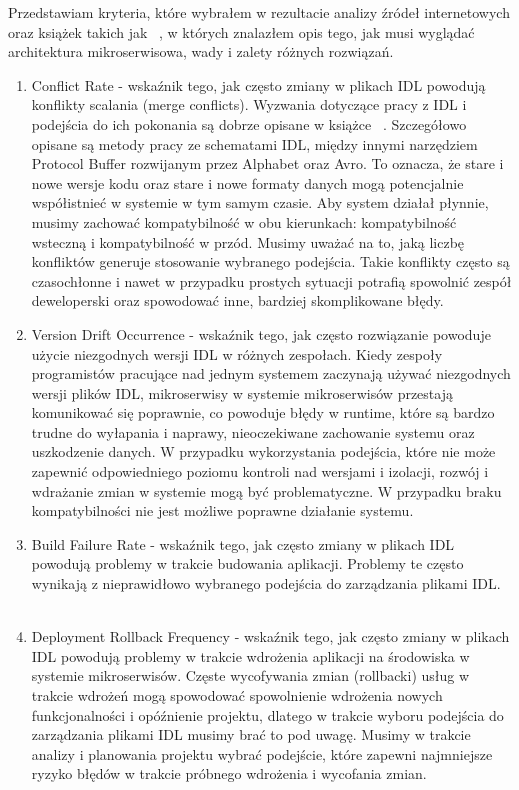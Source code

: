 \documentclass[runningheads,12pt]{llncs}
\begin{document}
Przedstawiam kryteria, które wybrałem w rezultacie analizy źródeł internetowych oraz książek takich jak ~\cite{kleppmann2017designing}, w których znalazłem opis tego, jak musi wyglądać architektura mikroserwisowa, wady i zalety różnych rozwiązań.

\begin{enumerate}
    \item Conflict Rate - wskaźnik tego, jak często zmiany w plikach IDL powodują konflikty scalania (merge conflicts). Wyzwania dotyczące pracy z IDL i podejścia do ich pokonania są dobrze opisane w książce ~\cite{kleppmann2017designing}. Szczegółowo opisane są metody pracy ze schematami IDL, między innymi narzędziem Protocol Buffer rozwijanym przez Alphabet oraz Avro. To oznacza, że stare i nowe wersje kodu oraz stare i nowe formaty danych mogą potencjalnie współistnieć w systemie w tym samym czasie. Aby system działał płynnie, musimy zachować kompatybilność w obu kierunkach: kompatybilność wsteczną i kompatybilność w przód. 
    Musimy uważać na to, jaką liczbę konfliktów generuje stosowanie wybranego podejścia. Takie konflikty często są czasochłonne i nawet w przypadku prostych sytuacji potrafią spowolnić zespół deweloperski oraz spowodować inne, bardziej skomplikowane błędy. ~\cite[p. 112]{kleppmann2017designing}
    \item Version Drift Occurrence - wskaźnik tego, jak często rozwiązanie powoduje użycie niezgodnych wersji IDL w różnych zespołach. Kiedy zespoły programistów pracujące nad jednym systemem zaczynają używać niezgodnych wersji plików IDL, mikroserwisy w systemie mikroserwisów przestają komunikować się poprawnie, co powoduje błędy w runtime, które są bardzo trudne do wyłapania i naprawy, nieoczekiwane zachowanie systemu oraz uszkodzenie danych. W przypadku wykorzystania podejścia, które nie może zapewnić odpowiedniego poziomu kontroli nad wersjami i izolacji, rozwój i wdrażanie zmian w systemie mogą być problematyczne. 
    W przypadku braku kompatybilności nie jest możliwe poprawne działanie systemu. ~\cite[p. 123]{kleppmann2017designing}
    \item Build Failure Rate - wskaźnik tego, jak często zmiany w plikach IDL powodują problemy w trakcie budowania aplikacji.  
    Problemy te często wynikają z nieprawidłowo wybranego podejścia do zarządzania plikami IDL. ~\cite[p. 123]{kleppmann2017designing}
    \item Deployment Rollback Frequency - wskaźnik tego, jak często zmiany w plikach IDL powodują problemy w trakcie wdrożenia aplikacji na środowiska w systemie mikroserwisów. 
    Częste wycofywania zmian (rollbacki) usług w trakcie wdrożeń mogą spowodować spowolnienie wdrożenia nowych funkcjonalności i opóźnienie projektu, dlatego w trakcie wyboru podejścia do zarządzania plikami IDL musimy brać to pod uwagę. Musimy w trakcie analizy i planowania projektu wybrać podejście, które zapewni najmniejsze ryzyko błędów w trakcie próbnego wdrożenia i wycofania zmian. ~\cite[p. 92]{kleppmann2017designing}
\end{enumerate}
\end{document}
